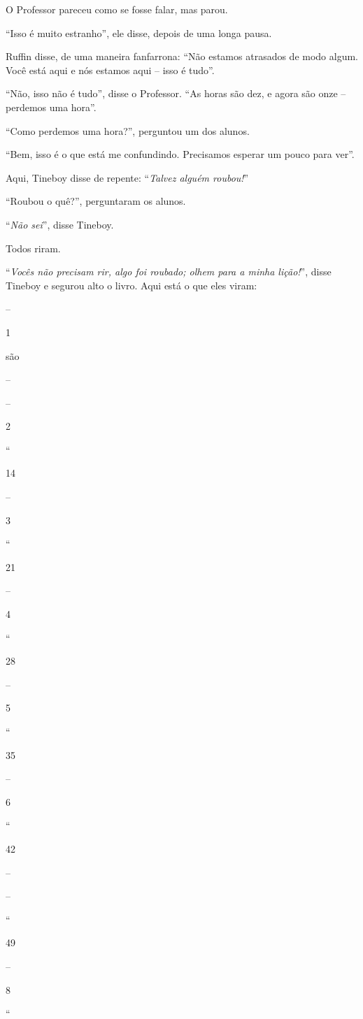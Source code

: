 O Professor pareceu como se fosse falar, mas parou.

``Isso é muito estranho'', ele disse, depois de uma longa pausa.

Ruffin disse, de uma maneira fanfarrona: ``Não estamos atrasados de modo
algum. Você está aqui e nós estamos aqui -- isso é tudo''.

``Não, isso não é tudo'', disse o Professor. ``As horas são dez, e agora
são onze -- perdemos uma hora''.

``Como perdemos uma hora?'', perguntou um dos alunos.

``Bem, isso é o que está me confundindo. Precisamos esperar um pouco
para ver''.

Aqui, Tineboy disse de repente: ``\emph{Talvez alguém roubou!}''

``Roubou o quê?'', perguntaram os alunos.

``\emph{Não sei}'', disse Tineboy.

Todos riram.

``\emph{Vocês não precisam rir, algo foi roubado; olhem para a minha
lição!}'', disse Tineboy e segurou alto o livro. Aqui está o que eles
viram:

--

1

são

--

--

2

``

14

--

3

``

21

--

4

``

28

--

5

``

35

--

6

``

42

--

--

``

49

--

8

``

